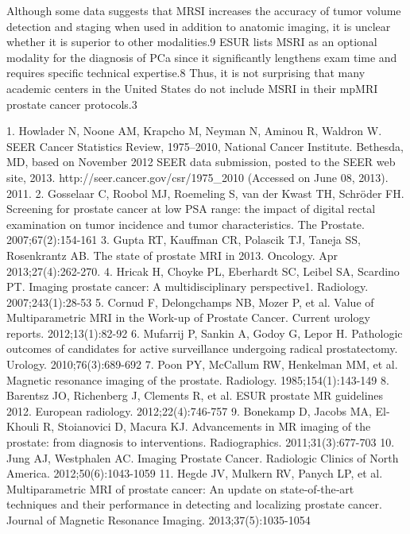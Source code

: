 Although some data suggests that MRSI increases the accuracy of tumor volume detection and staging when used in addition to anatomic imaging, it is unclear whether it is superior to other modalities.9 ESUR lists MSRI as an optional modality for the diagnosis of PCa since it significantly lengthens exam time and requires specific technical expertise.8 Thus, it is not surprising that many academic centers in the United States do not include MSRI in their mpMRI prostate cancer protocols.3



1.	Howlader N, Noone AM, Krapcho M, Neyman N, Aminou R, Waldron W. SEER Cancer Statistics Review, 1975–2010, National Cancer Institute. Bethesda, MD, based on November 2012 SEER data submission, posted to the SEER web site, 2013. http://seer.cancer.gov/csr/1975_2010 (Accessed on June 08, 2013). 2011.
2.	Gosselaar C, Roobol MJ, Roemeling S, van der Kwast TH, Schröder FH. Screening for prostate cancer at low PSA range: the impact of digital rectal examination on tumor incidence and tumor characteristics. The Prostate. 2007;67(2):154-161 %
3.	Gupta RT, Kauffman CR, Polascik TJ, Taneja SS, Rosenkrantz AB. The state of prostate MRI in 2013. Oncology. Apr 2013;27(4):262-270.
4.	Hricak H, Choyke PL, Eberhardt SC, Leibel SA, Scardino PT. Imaging prostate cancer: A multidisciplinary perspective1. Radiology. 2007;243(1):28-53 %
5.	Cornud F, Delongchamps NB, Mozer P, et al. Value of Multiparametric MRI in the Work-up of Prostate Cancer. Current urology reports. 2012;13(1):82-92 %
6.	Mufarrij P, Sankin A, Godoy G, Lepor H. Pathologic outcomes of candidates for active surveillance undergoing radical prostatectomy. Urology. 2010;76(3):689-692 %
7.	Poon PY, McCallum RW, Henkelman MM, et al. Magnetic resonance imaging of the prostate. Radiology. 1985;154(1):143-149 %
8.	Barentsz JO, Richenberg J, Clements R, et al. ESUR prostate MR guidelines 2012. European radiology. 2012;22(4):746-757 %
9.	Bonekamp D, Jacobs MA, El-Khouli R, Stoianovici D, Macura KJ. Advancements in MR imaging of the prostate: from diagnosis to interventions. Radiographics. 2011;31(3):677-703 %
10.	Jung AJ, Westphalen AC. Imaging Prostate Cancer. Radiologic Clinics of North America. 2012;50(6):1043-1059 %
11.	Hegde JV, Mulkern RV, Panych LP, et al. Multiparametric MRI of prostate cancer: An update on state‐of‐the‐art techniques and their performance in detecting and localizing prostate cancer. Journal of Magnetic Resonance Imaging. 2013;37(5):1035-1054 %
